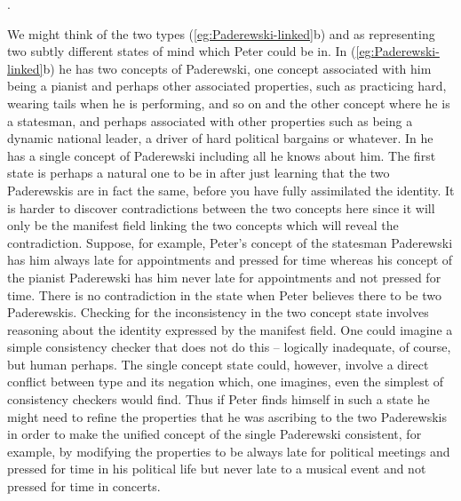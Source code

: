 \preveg{}.
\begin{ex} 
\end{ex} 
We might think of the two types (\ref{eg:Paderewski-linked}b) and \preveg{} as
representing two subtly different states of mind which Peter could be
in.  In (\ref{eg:Paderewski-linked}b) he has two concepts of Paderewski, one concept associated with him
being a pianist and perhaps other associated properties, such as
practicing hard, wearing tails when he is performing, and so on and
the other concept where he is a statesman, and perhaps associated with
other properties such as being a dynamic national leader, a driver of
hard political bargains or whatever.  In \preveg{} he has a
single concept of Paderewski including all he knows about him. The
first state is perhaps a natural one to be in after just learning that
the two Paderewskis are in fact the same, before you have fully
assimilated the identity.  It is harder to discover contradictions
between the two concepts here since it will only be the manifest field
linking the two concepts which will reveal the contradiction.
Suppose, for example, Peter's concept of the statesman Paderewski has
him always late for appointments and pressed for time whereas his
concept of the pianist Paderewski has him never late for appointments
and not pressed for time.  There is no contradiction in the state when
Peter believes there to be two Paderewskis.  Checking for the
inconsistency in the two concept state involves reasoning about the
identity expressed by the manifest field.  One could imagine a simple
consistency checker that does not do this -- logically inadequate, of
course, but human perhaps.  The single concept state could, however,
involve a direct conflict between type and its negation which, one
imagines, even the simplest of consistency checkers would find.  Thus
if Peter finds himself in such a state he might need to refine the
properties that he was ascribing to the two Paderewskis in order to
make the unified concept of the single Paderewski consistent, for
example, by modifying the properties to be always late for political
meetings and pressed for time in his political life but never late to
a musical event and not pressed for time in concerts.

